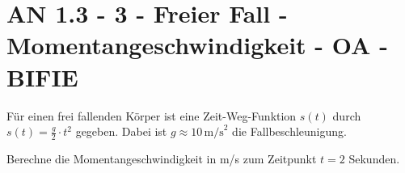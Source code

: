 \section{AN 1.3 - 3 - Freier Fall - Momentangeschwindigkeit - OA - BIFIE}

\begin{beispiel}[AN 1.3]{1} %
Für einen frei fallenden Körper ist eine Zeit-Weg-Funktion $s(t)$ durch $s(t)=\frac{g}{2}\cdot t^2$ gegeben. Dabei ist $g \approx 10\,\text{m/s}^2$ die Fallbeschleunigung.

Berechne die Momentangeschwindigkeit in m/s zum Zeitpunkt $t=2$ Sekunden.

\end{beispiel}